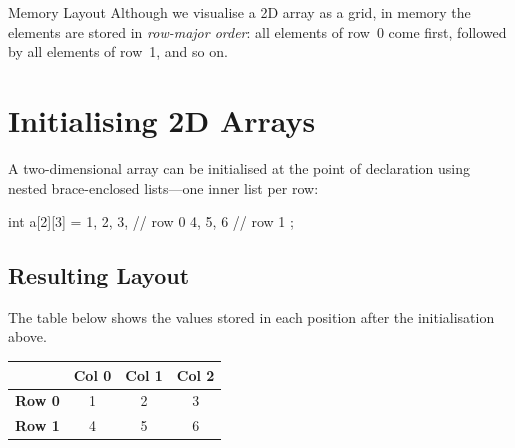 \begin{infobox}{Memory Layout}
Although we visualise a 2D array as a grid, in memory the elements are
stored in \emph{row-major order}: all elements of row~0 come first,
followed by all elements of row~1, and so on.

\medskip
\begin{center}
\end{center}
\end{infobox}

\section{Initialising 2D Arrays}
\label{sec:init-2d-arrays}

A two-dimensional array can be initialised at the point of declaration using
nested brace-enclosed lists---one inner list per row:

\begin{cppcode}
int a[2][3] = {
    {1, 2, 3},   // row 0
    {4, 5, 6}    // row 1
};
\end{cppcode}

\subsection*{Resulting Layout}

The table below shows the values stored in each position after the
initialisation above.

\begin{center}
\renewcommand{\arraystretch}{1.3}
\begin{tabular}{@{} c ccc @{}}
\toprule
    & \textbf{Col 0} & \textbf{Col 1} & \textbf{Col 2} \\
\midrule
\textbf{Row 0} & 1 & 2 & 3 \\
\textbf{Row 1} & 4 & 5 & 6 \\
\bottomrule
\end{tabular}
\end{center}


